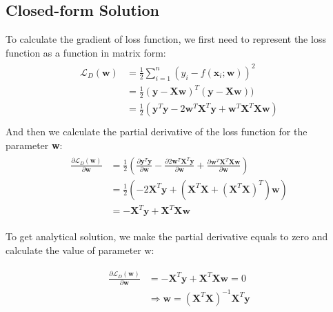 \documentclass[journal, a4paper]{IEEEtran}
\begin{document}
\subsection{Closed-form Solution}
To calculate the gradient of loss function, we first need to represent the loss function as a function in matrix form: 
\begin{equation}
\begin{split}
\begin{aligned}
\mathcal{L}_D(\textbf{w})&= \frac{1}{2}\sum_{i=1}^{n}{(y_i-f(\textbf{x}_i; \textbf{w}))}^2 \\
&= \frac{1}{2}(\textbf{y}-\textbf{Xw})^T(\textbf{y}-\textbf{Xw})) \\
&= \frac{1}{2}(\textbf{y}^T\textbf{y}-2\textbf{w}^T\textbf{X}^T\textbf{y}+\textbf{w}^T\textbf{X}^T\textbf{Xw} ) \\
\end{aligned}
\end{split}
\end{equation}
And then we calculate the partial derivative of the loss function for the parameter \textbf{w}:
\begin{equation}
\begin{split}
\begin{aligned}
\frac{\partial\mathcal{L}_D(\textbf{w})}{\partial\textbf{w}}
&= \frac{1}{2}(\frac{\partial\textbf{y}^T\textbf{y}}{\partial\textbf{w}}-\frac{\partial2\textbf{w}^T\textbf{X}^T\textbf{y}}{\partial\textbf{w}}+\frac{\partial\textbf{w}^T\textbf{X}^T\textbf{Xw}}{\partial\textbf{w}} ) \\
&= \frac{1}{2}(-2\textbf{X}^T\textbf{y}+(\textbf{X}^T\textbf{X}+(\textbf{X}^T\textbf{X})^T)\textbf{w}) \\
&= -\textbf{X}^T\textbf{y} + \textbf{X}^T\textbf{X}\textbf{w}
\end{aligned}
\end{split}
\end{equation}

To get analytical solution, we make the partial derivative equals to zero and calculate the value of parameter w:

\begin{equation}
\begin{split}
\begin{aligned}
\label{equ:7}
\frac{\partial\mathcal{L}_D(\textbf{w})}{\partial\textbf{w}}
&= -\textbf{X}^T\textbf{y} + \textbf{X}^T\textbf{X}\textbf{w} = 0 \\
&\Rightarrow\textbf{w} = (\textbf{X}^T\textbf{X})^{-1}\textbf{X}^T\textbf{y}
\end{aligned}
\end{split}
\end{equation}
\end{document}
